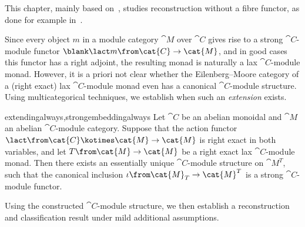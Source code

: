 This chapter,
mainly based on~\cite{stroinski2024:reconstr},
studies reconstruction without a fibre functor,
as done for example in~\cite[Theorem~1]{ostrik03:modul-hopf}.

Since every object \(m\) in a module category \(\cat{M}\) over \(\cat{C}\)
gives rise to a strong \(\cat{C}\)\hyp{}module functor \(\blank \lact m \from \cat{C} \to \cat{M}\),
and in good cases this functor has a right adjoint,
the resulting monad is naturally a lax \(\cat{C}\)\hyp{}module monad.
However, it is a priori not clear whether the Eilenberg–Moore category
of a (right exact) lax \(\cat{C}\)\hyp{}module monad even has a canonical \(\cat{C}\)\hyp{}module structure.
Using multicategorical techniques, we establish when such an \emph{extension} exists.

\begin{reptheorem}{extendingalways,strongembeddingalways}
  Let \(\cat{C}\) be an abelian monoidal and \(\cat{M}\) an abelian \(\cat{C}\)\hyp{}module category.
  Suppose that the action functor \(\lact \from \cat{C} \kotimes \cat{M} \to \cat{M}\) is right exact in both variables,
  and let \(T\from \cat{M}\to \cat{M}\) be a right exact lax \(\cat{C}\)\hyp{}module monad.
  Then there exists an essentially unique \(\cat{C}\)\hyp{}module structure on \(\cat{M}^{T}\),
  such that the canonical inclusion \(\iota\from \cat{M}_T \to \cat{M}^T\) is a strong \(\cat{C}\)\hyp{}module functor.
\end{reptheorem}

Using the constructed \(\cat{C}\)\hyp{}module structure,
we then establish a reconstruction and classification result
under mild additional assumptions.

